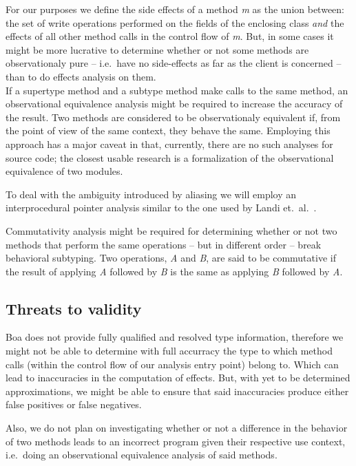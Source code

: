 \documentclass{acm_proc_article-sp}
\begin{document}
For our purposes we define the side effects of a method \emph{m} as the union between: the set of write operations performed on the fields of the enclosing class \emph{and} the effects of all other method calls in the control flow of \emph{m}. But, in some cases it might be more lucrative to determine whether or not some methods are observationaly pure \cite{barnett200499, naumann2007observational, cok2008extensions} -- i.e.\ have no side-effects as far as the client is concerned -- than to do effects analysis on them. \\
If a supertype method and a subtype method make calls to the same method, an observational equivalence\cite{definitionOfObservationalEquivalence} analysis might be required to increase the accuracy of the result. Two methods are considered to be observationaly equivalent if, from the point of view of the same context, they behave the same. Employing this approach has a major caveat in that, currently, there are no such analyses for source code; the closest usable research is a formalization of the observational equivalence of two modules\cite{aldrich2005open}.

To deal with the ambiguity introduced by aliasing we will employ an interprocedural pointer analysis similar to the one used by Landi et.\ al.\ .

Commutativity analysis \cite{rinard1997commutativity, aleen2009commutativity} might be required for determining whether or not two methods that perform the same operations -- but in different order -- break behavioral subtyping. Two operations, \emph{A} and \emph{B}, are said to be commutative if the result of applying \emph{A} followed by \emph{B} is the same as applying \emph{B} followed by \emph{A}.

\subsection{Threats to validity}
Boa does not provide fully qualified and resolved type information, therefore we might not be able to determine with full accurracy the type to which method calls (within the control flow of our analysis entry point) belong to. Which can lead to inaccuracies in the computation of effects. But, with yet to be determined approximations, we might be able to ensure that said inaccuracies produce either false positives or false negatives.

Also, we do not plan on investigating whether or not a difference in the behavior of two methods leads to an incorrect program given their respective use context, i.e.\ doing an observational equivalence analysis of said methods.
\end{document}

